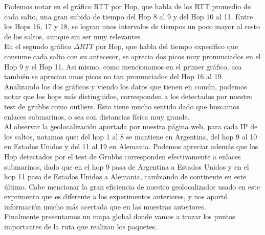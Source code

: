Podemos notar en el gráfico RTT por Hop, que habla de los RTT promedio de cada salto, una gran subida de tiempo del Hop 8 al 9 y del Hop 10 al 11. Entre los Hops 16, 17 y 18, se logran unos intervalos de tiempos un poco mayor al resto de los saltos, aunque sin ser muy relevantes.\\

En el segundo gráfico $\Delta RTT$ por Hop, que habla del tiempo expecifico que consume cada salto con su antecesor, se aprecia dos picos muy pronunciados en el Hop 9 y el Hop 11. Asi mismo, como mencionamos en el primer gráfico, aca también se aprecian unos picos no tan pronunciados del Hop 16 al 19.\\

Analizando los dos gráficos y viendo los datos que tienen en común, podemos notar que los hops más distinguidos, corresponden a los detectados por nuestro test de grubbs como outliers. Esto tiene mucho sentido dado que buscamos enlaces submarinos, o sea con distancias física muy grande.\\

Al observar la geolocalización aportada por nuestra página web, para cada IP de los saltos, notamos que: del hop 1 al 8 se mantiene en Argentina, del hop 9 al 10 en Estados Unidos y del 11 al 19 en Alemania. Podemos apreciar además que los Hop detectados por el test de Grubbs corresponden efectivamente a enlaces submarinos, dado que en el hop 9 pasa de Argentina a Estados Unidos y en el hop 11 pasa de Estados Unidos a Alemania, cambiando de continente en este último. Cabe mencionar la gran eficiencia de nuestro geolocalizador usado en este exprimento que es diferente a los experimentos anteriores, y nos aportó información mucho más acertada que en las muestras anteriores.\\

Finalmente presentamos un mapa global donde vamos a trazar los puntos importantes de la ruta que realizan los paquetes. 


